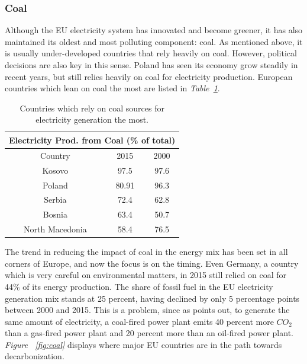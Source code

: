 \documentclass[a4paper,12pt]{book}
\begin{document}
\subsubsection*{Coal}

Although the EU electricity system has innovated and become greener, it has also maintained its oldest and most polluting component: coal. As mentioned above, it is usually under-developed countries that rely heavily on coal. However, political decisions are also key in this sense. Poland has seen its economy grow steadily in recent years, but still relies heavily on coal for electricity production. European countries which lean on coal the most are listed in \textit{Table~\ref{Tab:gen}}.

\begin{table}[tb]
\begin{center}
\begin{tabular}{|c|c|c|}
\hline
\multicolumn{3}{|c|}{Electricity Prod. from Coal (\% of total)}\\
\hline
Country & 2015 & 2000 \\
\hline
Kosovo & 97.5 & 97.6\\
Poland & 80.91 & 96.3 \\
Serbia & 72.4 & 62.8 \\
Bosnia & 63.4 & 50.7\\
North Macedonia & 58.4 & 76.5\\
\hline
\end{tabular}
\caption{Countries which rely on coal sources for electricity generation the most.}
\label{Tab:gen}
\end{center}
\end{table}

The trend in reducing the impact of coal in the energy mix has been set in all corners of Europe, and now the focus is on the timing. Even Germany, a country which is very careful on environmental matters, in 2015 still relied on coal for 44\% of its energy production. The share of fossil fuel in the EU electricity generation mix stands at 25 percent, having declined by only 5 percentage points between 2000 and 2015. This is a problem, since as \cite{tagliapietra2017beyond} points out, to generate the same amount of electricity, a coal-fired power plant emits 40 percent more $CO_2$ than a gas-fired power plant and 20 percent more than an oil-fired power plant. \textit{Figure ~\ref{fig:coal}} displays where major EU countries are in the path towards decarbonization.
\end{document}
